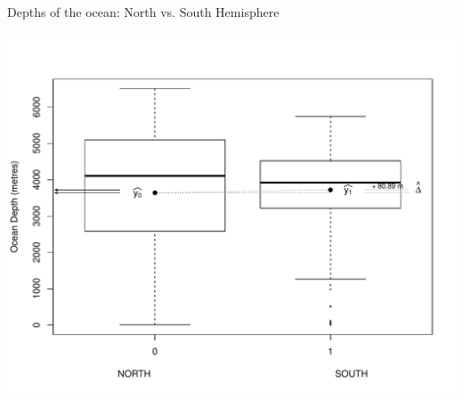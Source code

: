 \documentclass{beamer}\usepackage[]{graphicx}\usepackage[]{color}
\newenvironment{knitrout}{}{} %
\begin{document}
\begin{frame}[fragile]{Depths of the ocean: North vs. South Hemisphere}

\begin{knitrout}\tiny
{}\color{fgcolor}

{\centering \includegraphics[width=1\linewidth]{figure/unnamed-chunk-2-1} 

}



\end{knitrout}


\end{frame}
\end{document}
